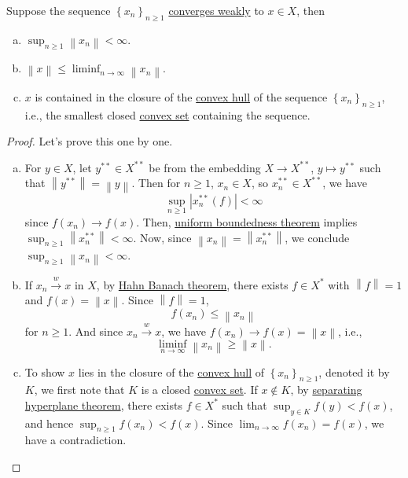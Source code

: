 \begin{proposition}\label{prop:lec16}
	Suppose the sequence \(\left\{ x_n \right\} _{n\geq 1}\) \hyperref[def:weakly-convergence]{converges weakly} to \(x\in X\), then
	\begin{enumerate}[(a)]
		\item \(\sup _{n \geq 1} \left\lVert x_n\right\rVert < \infty \).
		\item \(\left\lVert x\right\rVert \leq \liminf_{n \to \infty} \left\lVert x_n\right\rVert \).
		\item \(x\) is contained in the closure of the \href{https://en.wikipedia.org/wiki/Convex_hull}{convex hull} of the sequence \(\left\{ x_n \right\} _{n\geq 1}\), i.e., the smallest closed \hyperref[def:convex-set]{convex set} containing the sequence.
	\end{enumerate}
\end{proposition}
\begin{proof}
	Let's prove this one by one.
	\begin{enumerate}[(a)]
		\item For \(y\in X\), let \(y^{\ast\ast}\in X^{\ast\ast}\) be from the embedding \(X\to X^{\ast\ast}\), \(y \mapsto y^{\ast\ast}\) such that \(\left\lVert y^{\ast\ast}\right\rVert = \left\lVert y\right\rVert \). Then for \(n \geq 1\), \(x_n \in X\), so \(x_n^{\ast\ast}\in X^{\ast\ast}\), we have
		      \[
			      \sup _{n\geq 1} \left\vert x_n^{\ast\ast}(f) \right\vert < \infty
		      \]
		      since \(f(x_n)\to f(x)\). Then, \hyperref[thm:uniform-boundedness]{uniform boundedness theorem} implies \(\sup _{n\geq 1} \left\lVert x_n^{\ast\ast}\right\rVert < \infty \). Now, since \(\left\lVert x_n\right\rVert = \left\lVert x_n^{\ast\ast}\right\rVert \), we conclude \(\sup _{n\geq 1}\left\lVert x_n\right\rVert < \infty\).
		\item If \(x_n \overset{w}{\to } x\) in \(X\), by \hyperref[thm:Hahn-Banach]{Hahn Banach theorem}, there exists \(f\in X^{\ast} \) with \(\left\lVert f\right\rVert = 1\) and \(f(x) = \left\lVert x\right\rVert\). Since \(\left\lVert f\right\rVert = 1\),
		      \[
			      f(x_n) \leq \left\lVert x_n\right\rVert
		      \]
		      for \(n \geq 1\). And since \(x_n \overset{w}{\to } x\), we have \(f(x_n)\to f(x)= \left\lVert x\right\rVert \), i.e.,
		      \[
			      \liminf_{n \to \infty} \left\lVert x_n\right\rVert \geq \left\lVert x\right\rVert .
		      \]
		\item To show \(x\) lies in the closure of the \href{https://en.wikipedia.org/wiki/Convex_hull}{convex hull} of \(\left\{ x_n \right\} _{n\geq 1}\), denoted it by \(K\), we first note that \(K\) is a closed \hyperref[def:convex-set]{convex set}. If \(x \notin K\), by \hyperref[thm:separation-of-convex-sets]{separating hyperplane theorem}, there exists \(f\in X^{\ast} \) such that \(\sup _{y\in K}f(y) < f(x)\), and hence \(\sup _{n\geq 1}f(x_n) < f(x)\). Since \(\lim_{n \to \infty} f(x_n)=f(x)\), we have a contradiction.
	\end{enumerate}
\end{proof}

